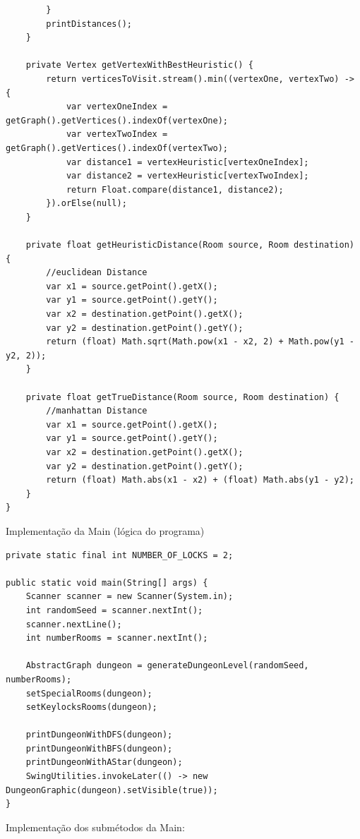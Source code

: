 \documentclass[a4paper, 12pt]{article}
\begin{document}
\begin{verbatim}
        }
        printDistances();
    }

    private Vertex getVertexWithBestHeuristic() {
        return verticesToVisit.stream().min((vertexOne, vertexTwo) -> {
            var vertexOneIndex = getGraph().getVertices().indexOf(vertexOne);
            var vertexTwoIndex = getGraph().getVertices().indexOf(vertexTwo);
            var distance1 = vertexHeuristic[vertexOneIndex];
            var distance2 = vertexHeuristic[vertexTwoIndex];
            return Float.compare(distance1, distance2);
        }).orElse(null);
    }

    private float getHeuristicDistance(Room source, Room destination) {
        //euclidean Distance
        var x1 = source.getPoint().getX();
        var y1 = source.getPoint().getY();
        var x2 = destination.getPoint().getX();
        var y2 = destination.getPoint().getY();
        return (float) Math.sqrt(Math.pow(x1 - x2, 2) + Math.pow(y1 - y2, 2));
    }

    private float getTrueDistance(Room source, Room destination) {
        //manhattan Distance
        var x1 = source.getPoint().getX();
        var y1 = source.getPoint().getY();
        var x2 = destination.getPoint().getX();
        var y2 = destination.getPoint().getY();
        return (float) Math.abs(x1 - x2) + (float) Math.abs(y1 - y2);
    }
}
\end{verbatim}

Implementação da Main (lógica do programa)

\begin{verbatim}
private static final int NUMBER_OF_LOCKS = 2;

public static void main(String[] args) {
    Scanner scanner = new Scanner(System.in);
    int randomSeed = scanner.nextInt();
    scanner.nextLine();
    int numberRooms = scanner.nextInt();

    AbstractGraph dungeon = generateDungeonLevel(randomSeed, numberRooms);
    setSpecialRooms(dungeon);
    setKeylocksRooms(dungeon);

    printDungeonWithDFS(dungeon);
    printDungeonWithBFS(dungeon);
    printDungeonWithAStar(dungeon);
    SwingUtilities.invokeLater(() -> new DungeonGraphic(dungeon).setVisible(true));
}
\end{verbatim}

Implementação dos submétodos da Main:
\end{document}
